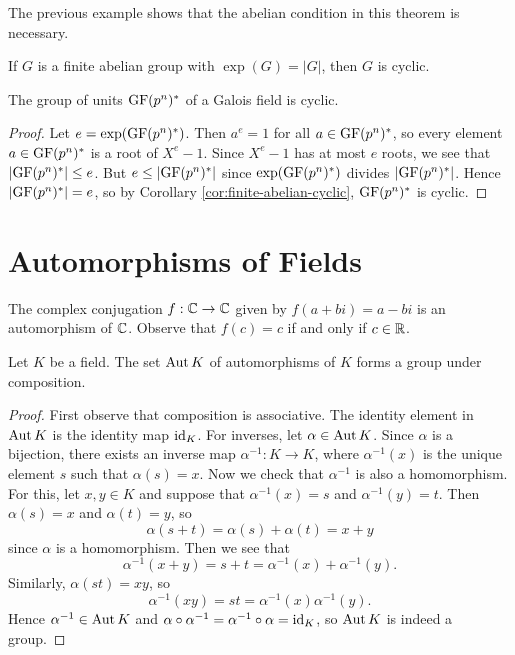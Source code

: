 \begin{remark}
  The previous example shows that the abelian condition
  in this theorem is necessary.
\end{remark}

\begin{corollary}
  \label{cor:finite-abelian-cyclic}
  If $G$ is a finite abelian group with $\exp(G) = |G|$,
  then $G$ is cyclic.
\end{corollary}

\begin{theorem}
  The group of units
  $\mathrm{GF}(p^n)^*$
  of a Galois field is cyclic.
\end{theorem}

\begin{proof}
  Let $e = \exp(\mathrm{GF}(p^n)^*)$. Then $a^e = 1$ for
  all $a \in \mathrm{GF}(p^n)^*$, so every element
  $a \in \mathrm{GF}(p^n)^*$ is a root of $X^e - 1$. Since
  $X^e - 1$ has at most $e$ roots, we see that
  $|\mathrm{GF}(p^n)^*| \le e$. But $e \le |\mathrm{GF}(p^n)^*|$ since
  $\exp(\mathrm{GF}(p^n)^*)$ divides $|\mathrm{GF}(p^n)^*|$. Hence
  $|\mathrm{GF}(p^n)^*| = e$, so by Corollary \ref{cor:finite-abelian-cyclic},
  $\mathrm{GF}(p^n)^*$ is cyclic.
\end{proof}

\section{Automorphisms of Fields}

\begin{example}
  The complex conjugation $f : \mathbb{C} \to \mathbb{C}$ given by
  $f(a + bi) = a - bi$ is an automorphism of $\mathbb{C}$.
  Observe that $f(c) = c$ if and only if $c \in \mathbb{R}$.
\end{example}

\begin{theorem}
  Let $K$ be a field. The set $\operatorname{Aut} K$ of automorphisms
  of $K$ forms a group under composition.
\end{theorem}

\begin{proof}
  First observe that composition is associative. The
  identity element in $\operatorname{Aut} K$ is the identity map
  $\mathrm{id}_K$. For inverses, let $\alpha \in \operatorname{Aut} K$. Since
  $\alpha$ is a bijection, there exists an inverse map
  $\alpha^{-1} : K \to K$, where $\alpha^{-1}(x)$
  is the unique element $s$ such that $\alpha(s) = x$. Now
  we check that $\alpha^{-1}$ is also a homomorphism.
  For this, let $x, y \in K$ and suppose that
  $\alpha^{-1}(x) = s$ and $\alpha^{-1}(y) = t$. Then
  $\alpha(s) = x$ and $\alpha(t) = y$, so
  \[
    \alpha(s + t) = \alpha(s) + \alpha(t) = x + y
  \]
  since $\alpha$ is a homomorphism. Then we see that
  \[
    \alpha^{-1}(x + y) = s + t = \alpha^{-1}(x) + \alpha^{-1}(y).
  \]
  Similarly, $\alpha(st) = xy$, so
  \[
    \alpha^{-1}(xy) = st = \alpha^{-1}(x) \alpha^{-1}(y). \]
  Hence $\alpha^{-1} \in \operatorname{Aut} K$ and
  $\alpha \circ \alpha^{-1} = \alpha^{-1} \circ \alpha = \mathrm{id}_K$,
  so $\operatorname{Aut} K$ is indeed a group.
\end{proof}

